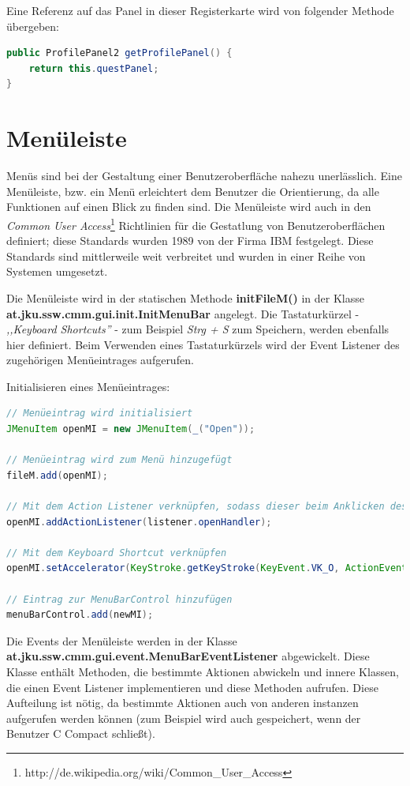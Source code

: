 Eine Referenz auf das Panel in dieser Registerkarte wird von folgender Methode übergeben:
\begin{lstlisting}[language=JAVA]
public ProfilePanel2 getProfilePanel() {
	return this.questPanel;
}
\end{lstlisting}

\section{Menüleiste}
\label{sec:gui-main-menu}
Menüs sind bei der Gestaltung einer Benutzeroberfläche nahezu unerlässlich. Eine Menüleiste, bzw. ein Menü erleichtert dem Benutzer die Orientierung, da alle Funktionen auf einen Blick zu finden sind. Die Menüleiste wird auch in den \emph{Common User Access}\footnote{http://de.wikipedia.org/wiki/Common\_User\_Access} Richtlinien für die Gestatlung von Benutzeroberflächen definiert; diese Standards wurden 1989 von der Firma IBM festgelegt. Diese Standards sind mittlerweile weit verbreitet und wurden in einer Reihe von Systemen umgesetzt.

Die Menüleiste wird in der statischen Methode \textbf{initFileM()} in der Klasse \textbf{at.jku.ssw.cmm.gui.init.InitMenuBar} angelegt. Die Tastaturkürzel - \emph{,,Keyboard Shortcuts''} - zum Beispiel \emph{Strg + S} zum Speichern, werden ebenfalls hier definiert. Beim Verwenden eines Tastaturkürzels wird der Event Listener des zugehörigen Menüeintrages aufgerufen.

Initialisieren eines Menüeintrages:
\begin{lstlisting}[language=JAVA]
// Menüeintrag wird initialisiert
JMenuItem openMI = new JMenuItem(_("Open"));

// Menüeintrag wird zum Menü hinzugefügt
fileM.add(openMI);

// Mit dem Action Listener verknüpfen, sodass dieser beim Anklicken des Menüs aufgerufen wird
openMI.addActionListener(listener.openHandler);

// Mit dem Keyboard Shortcut verknüpfen
openMI.setAccelerator(KeyStroke.getKeyStroke(KeyEvent.VK_O, ActionEvent.CTRL_MASK));

// Eintrag zur MenuBarControl hinzufügen
menuBarControl.add(newMI);
\end{lstlisting}

Die Events der Menüleiste werden in der Klasse \textbf{at.jku.ssw.cmm.gui.event.MenuBarEventListener} abgewickelt. Diese Klasse enthält Methoden, die bestimmte Aktionen abwickeln und innere Klassen, die einen Event Listener implementieren und diese Methoden aufrufen. Diese Aufteilung ist nötig, da bestimmte Aktionen auch von anderen instanzen aufgerufen werden können (zum Beispiel wird auch gespeichert, wenn der Benutzer C Compact schließt).

